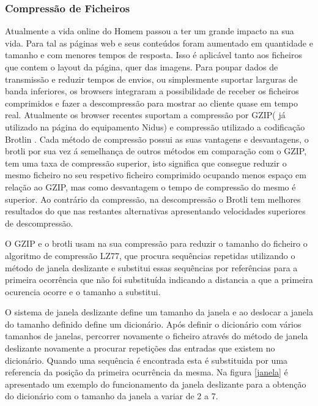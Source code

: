 \subsubsection{Compressão de Ficheiros}
\par
Atualmente a vida online do Homem passou a ter um grande impacto na sua vida. Para tal as páginas web e seus conteúdos foram aumentado em quantidade e tamanho e com menores tempos de resposta. Isso é aplicável tanto aos ficheiros que contem o layout da página, quer das imagens. Para poupar dados de transmissão e reduzir tempos de envios, ou simplesmente suportar larguras de banda inferiores, os browsers integraram a possibilidade de receber os ficheiros comprimidos e fazer a descompressão para mostrar ao cliente quase em tempo real. Atualmente os browser recentes suportam a compressão por GZIP( já utilizado na página do equipamento Nidus) e compressão utilizado a codificação Brotlin \cite{Alakuijala2019} \cite{brotlirfc}.
Cada método de compressão possui as suas vantagens e desvantagens, o brotli por sua vez á semelhança de outros métodos em comparação com o GZIP, tem uma taxa de compressão superior\cite{Alakuijala2015}, isto significa que consegue reduzir o mesmo ficheiro no seu respetivo ficheiro comprimido ocupando menos espaço em relação ao GZIP, mas como desvantagem o tempo de compressão do mesmo é superior. Ao contrário da compressão, na descompressão o Brotli tem melhores resultados do que nas restantes alternativas apresentando velocidades superiores de descompressão.
\par
O GZIP e o brotli usam na sua compressão para reduzir o tamanho do ficheiro o algoritmo de compressão LZ77, que procura sequências repetidas utilizando o método de janela deslizante e substitui essas sequências por referências para a primeira ocorrência que não foi substituída indicando a distancia a que a primeira ocurencia ocorre e o tamanho a substitui.
\par O sistema de janela deslizante define um tamanho da janela e ao deslocar a janela do tamanho definido define um dicionário. Após definir o dicionário com vários tamanhos de janelas, percorrer novamente o ficheiro através do método de janela deslizante novamente a procurar repetições das entradas que existem no dicionário. Quando uma sequência é encontrada esta é substituida por uma referencia da posição da primeira ocurrência da mesma. Na figura \ref{janela} é apresentado um exemplo do funcionamento da janela deslizante para a obtenção do dicionário com o tamanho da janela a variar de 2 a 7.
